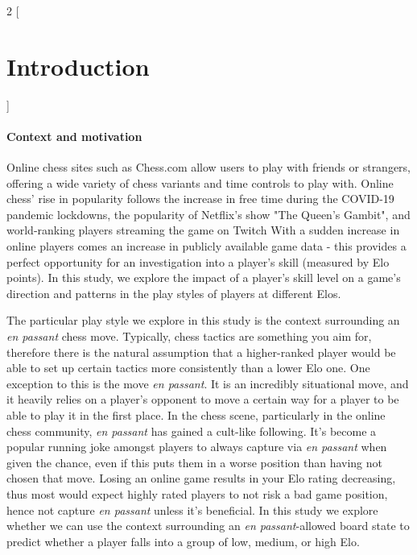 \documentclass[10pt,a4paper]{article}
\begin{document}
\begin{multicols}{2}
[
\section{Introduction}
]

\paragraph{Context and motivation}

Online chess sites such as Chess.com allow users to play with friends or strangers, offering a wide variety of chess variants and time controls to play with. Online chess' rise in popularity follows the increase in free time during the COVID-19 pandemic lockdowns, the popularity of Netflix's show "The Queen's Gambit", and world-ranking players streaming the game on Twitch \cite{The2020ChessBoom} With a sudden increase in online players comes an increase in publicly available game data - this provides a perfect opportunity for an investigation into a player's skill (measured by Elo points). In this study, we explore the impact of a player's skill level on a game's direction and patterns in the play styles of players at different Elos. \newline

The particular play style we explore in this study is the context surrounding an \textit{en passant} chess move. Typically, chess tactics are something you aim for, therefore there is the natural assumption that a higher-ranked player would be able to set up certain tactics more consistently than a lower Elo one. One exception to this is the move \textit{en passant}. It is an incredibly situational move, and it heavily relies on a player's opponent to move a certain way for a player to be able to play it in the first place. In the chess scene, particularly in the online chess community, \textit{en passant} has gained a cult-like following\cite{EnPassant}. It's become a popular running joke amongst players to always capture via \textit{en passant} when given the chance, even if this puts them in a worse position than having not chosen that move. Losing an online game results in your Elo rating decreasing, thus most would expect highly rated players to not risk a bad game position, hence not capture \textit{en passant} unless it's beneficial. In this study we explore whether we can use the context surrounding an \textit{en passant}-allowed board state to predict whether a player falls into a group of low, medium, or high Elo. \newline


\end{multicols}
\end{document}
